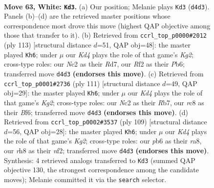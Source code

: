 \documentclass[11pt]{article}
\begin{document}
\clearpage

\begin{figure}[p]\centering
\begin{subfigure}{0.46\textwidth}\centering
\resizebox{\linewidth}{!}{%
\newchessgame
\chessboard[
  setfen={2r3kr/pn6/1p2p3/7p/2PKPB2/6PR/P1N2R2/8 w - - 8 63},
  showmover=false,
  pgfstyle=straightmove, color=movearrow, markmove={d4-d3}
]}
\caption{}
\end{subfigure}\hfill
\begin{subfigure}{0.46\textwidth}\centering
\resizebox{\linewidth}{!}{%
\newchessgame
\chessboard[
  setfen={8/3r2k1/1p3p2/p5pP/P3b1P1/3p3R/1P3K2/3R4 b - - 3 57},
  showmover=false,
  pgfstyle=straightmove, color=movearrow, markmove={g7-h6}
]}
\caption{}
\end{subfigure}
\\[4pt]
\begin{subfigure}{0.46\textwidth}\centering
\resizebox{\linewidth}{!}{%
\newchessgame
\chessboard[
  setfen={8/1r4k1/2r2bp1/7p/7P/2pNP1P1/2R1K3/2R5 b - - 4 56},
  showmover=false,
  pgfstyle=straightmove, color=movearrow, markmove={g7-h6}
]}
\caption{}
\end{subfigure}\hfill
\begin{subfigure}{0.46\textwidth}\centering
\resizebox{\linewidth}{!}{%
\newchessgame
\chessboard[
  setfen={R2R4/5pk1/4p1p1/4P3/3P1r1p/5P1K/5NP1/1r3n2 b - - 23 55},
  showmover=false,
  pgfstyle=straightmove, color=movearrow, markmove={g7-h6}
]}
\caption{}
\end{subfigure}
\caption{\textbf{Move 63, White: \texttt{Kd3}.} (a) Our position; Melanie plays \texttt{Kd3} (\texttt{d4d3}). Panels (b)--(d) are the retrieved master positions whose correspondence most drove this move (highest QAP objective among those that transfer to it). (b) Retrieved from \texttt{ccrl\_top\_p0000\#2012} (ply 113) [structural distance $d$=51, QAP obj=48]: the master played \texttt{Kh6}; under $\mu$ our \emph{Kd4} plays the role of that game's \emph{Kg2}; cross-type roles: our \emph{N}c2 as their \emph{R}d7, our \emph{R}f2 as their \emph{P}b6; transferred move \texttt{d4d3} \textbf{(endorses this move)}. (c) Retrieved from \texttt{ccrl\_top\_p0001\#2736} (ply 111) [structural distance $d$=49, QAP obj=29]: the master played \texttt{Kh6}; under $\mu$ our \emph{Kd4} plays the role of that game's \emph{Kg2}; cross-type roles: our \emph{N}c2 as their \emph{R}b7, our \emph{r}c8 as their \emph{B}f6; transferred move \texttt{d4d3} \textbf{(endorses this move)}. (d) Retrieved from \texttt{ccrl\_top\_p0002\#3537} (ply 109) [structural distance $d$=56, QAP obj=28]: the master played \texttt{Kh6}; under $\mu$ our \emph{Kd4} plays the role of that game's \emph{Kg2}; cross-type roles: our \emph{p}b6 as their \emph{r}a8, our \emph{r}h8 as their \emph{n}f2; transferred move \texttt{d4d3} \textbf{(endorses this move)}. Synthesis: 4 retrieved analogs transferred to \texttt{Kd3} (summed QAP objective 130, the strongest correspondence among the candidate moves); Melanie committed it via the \texttt{search} selector.}
\label{fig:thought-m124}
\end{figure}
\end{document}
